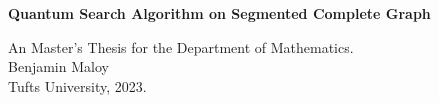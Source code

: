 \begin{titlepage}
   \begin{center}
      \vspace*{4cm}
   
      \textbf{Quantum Search Algorithm on Segmented Complete Graph}

      \vspace{1.5cm}

       An Master's Thesis for the Department of Mathematics.\\
       Benjamin Maloy\\
       Tufts University, 2023.
   \end{center}
\end{titlepage}